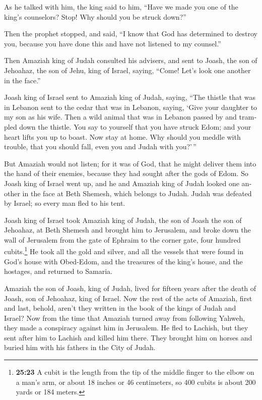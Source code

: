 \begin{paracol}{2}
\begin{otherlanguage}{english}
 As he talked with him, the king said to him, ``Have we
made you one of the king's counselors? Stop! Why should you be struck
down?''

Then the prophet stopped, and said, ``I know that God has determined to
destroy you, because you have done this and have not listened to my
counsel.''

 Then Amaziah king of Judah consulted his advisers, and
sent to Joash, the son of Jehoahaz, the son of Jehu, king of Israel,
saying, ``Come! Let's look one another in the face.''

 Joash king of Israel sent to Amaziah king of Judah,
saying, ``The thistle that was in Lebanon sent to the cedar that was in
Lebanon, saying, `Give your daughter to my son as his wife. Then a wild
animal that was in Lebanon passed by and trampled down the thistle.
 You say to yourself that you have struck Edom; and your
heart lifts you up to boast. Now stay at home. Why should you meddle
with trouble, that you should fall, even you and Judah with you?'\,''

 But Amaziah would not listen; for it was of God, that he
might deliver them into the hand of their enemies, because they had
sought after the gods of Edom.  So Joash king of Israel
went up, and he and Amaziah king of Judah looked one another in the face
at Beth Shemesh, which belongs to Judah.  Judah was
defeated by Israel; so every man fled to his tent.

 Joash king of Israel took Amaziah king of Judah, the son
of Joash the son of Jehoahaz, at Beth Shemesh and brought him to
Jerusalem, and broke down the wall of Jerusalem from the gate of Ephraim
to the corner gate, four hundred cubits.\footnote{\textbf{25:23} A cubit
  is the length from the tip of the middle finger to the elbow on a
  man's arm, or about 18 inches or 46 centimeters, so 400 cubits is
  about 200 yards or 184 meters.}  He took all the gold
and silver, and all the vessels that were found in God's house with
Obed-Edom, and the treasures of the king's house, and the hostages, and
returned to Samaria.

 Amaziah the son of Joash, king of Judah, lived for
fifteen years after the death of Joash, son of Jehoahaz, king of Israel.
 Now the rest of the acts of Amaziah, first and last,
behold, aren't they written in the book of the kings of Judah and
Israel?  Now from the time that Amaziah turned away from
following Yahweh, they made a conspiracy against him in Jerusalem. He
fled to Lachish, but they sent after him to Lachish and killed him
there.  They brought him on horses and buried him with
his fathers in the City of Judah.


\end{otherlanguage}
\end{paracol}
